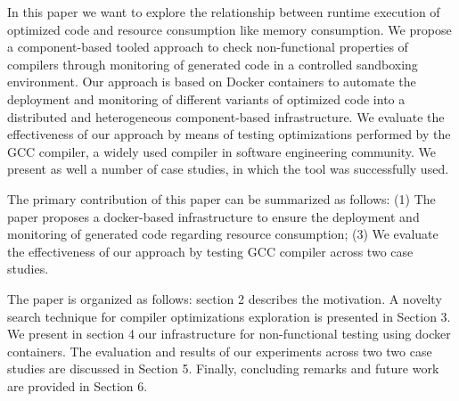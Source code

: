 In this paper we want to explore the relationship between runtime execution of optimized code and resource consumption like memory consumption.
We propose a component-based tooled approach to check non-functional properties of compilers through monitoring of generated code in a controlled sandboxing environment. Our approach is based on Docker containers to automate the deployment and monitoring of different variants of optimized code into a distributed and heterogeneous component-based infrastructure. 
We evaluate the effectiveness of our approach by means of testing optimizations performed by the GCC compiler, a widely used compiler in software engineering community. We present as well a number of case studies, in which the tool was successfully used.


The primary contribution of this paper can be summarized as follows: (1) The paper proposes a docker-based infrastructure to ensure the deployment and monitoring of generated code regarding resource consumption; (3) We evaluate the effectiveness of our approach by testing GCC compiler across two case studies.
 

The paper is organized as follows: section 2 describes the motivation. A novelty search technique for compiler optimizations exploration is presented in Section 3. We present in section 4 our infrastructure for non-functional testing using docker containers. The evaluation and results of our experiments across two two case studies are discussed in Section 5. Finally, concluding remarks and future work are provided in Section 6.




 
 

